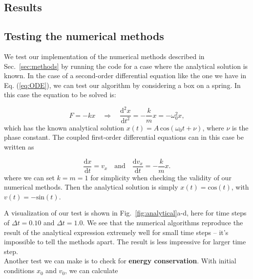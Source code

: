 \documentclass{article}
\begin{document}
\begin{multicols}{2}
\section{Results}

\subsection{Testing the numerical methods}\label{sec:analytical_test}

We test our implementation of the numerical methods described in Sec.~\ref{sec:methods} by running the code for a case where the analytical solution is known. In the case of a second-order differential equation like the one we have in Eq. (\ref{eq:ODE}), we can test our algorithm by considering a box on a spring. In this case the equation to be solved is:

\begin{equation}
	F = -kx \quad \Rightarrow \quad \frac{\mathrm{d}^2 x}{\mathrm{d}t^2} = - \frac{k}{m}x = - \omega_0^2 x,
\end{equation}
which has the known analytical solution $x(t) = A \, \mathrm{cos}(\omega_0 t + \nu)$, where $\nu$ is the phase constant. The coupled first-order differential equations can in this case be written as

\begin{equation}
	\frac{\mathrm{d}x}{\mathrm{d}t} = v_x  \quad \mathrm{and} \quad \frac{\mathrm{d}v_x}{\mathrm{d}t} = - \frac{k}{m} x.
\end{equation}
where we can set $k = m = 1$ for simplicity when checking the validity of our numerical methods. Then the analytical solution is simply $x(t) = \mathrm{cos}(t)$, with $v(t) = - \mathrm{sin}(t)$.

A visualization of our test is shown in Fig.~\ref{fig:analytical}a-d, here for time steps of $\Delta t = 0.10$ and $\Delta t = 1.0$. We see that the numerical algorithms reproduce the result of the analytical expression extremely well for small time steps -- it's impossible to tell the methods apart. The result is less impressive for larger time step.\\

\noindent Another test we can make is to check for \textbf{energy conservation}. With initial conditions $x_0$ and $v_0$, we can calculate


\end{multicols}
\end{document}
